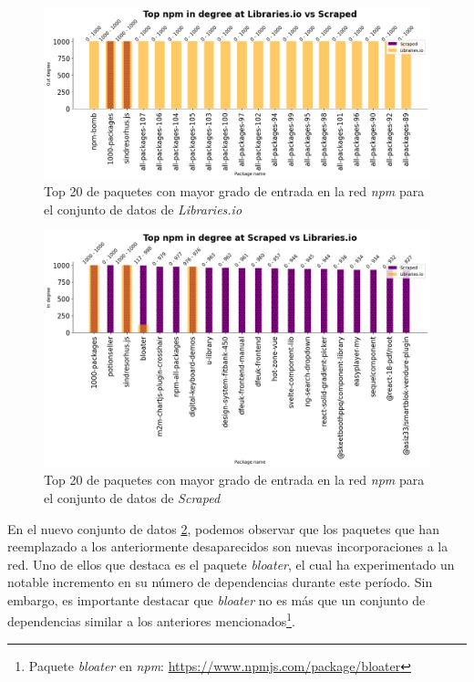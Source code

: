 \begin{figure}[ht!]
    \begin{center}
        \includegraphics[width=1\textwidth]{img/npm/ind_ls.png}
        \caption{Top 20 de paquetes con mayor grado de entrada en la red \textit{npm} para el conjunto de datos de \textit{Libraries.io}}
    \end{center}
    \label{fig:npm_ind_libraries}
\end{figure}

\begin{figure}[ht!]
    \begin{center}
        \includegraphics[width=1\textwidth]{img/npm/ind-sl.png}
        \caption{Top 20 de paquetes con mayor grado de entrada en la red \textit{npm} para el conjunto de datos de \textit{Scraped}}
    \end{center}
    \label{fig:npm_ind_scraped}
\end{figure}

En el nuevo conjunto de datos \ref{fig:npm_ind_scraped}, podemos observar que los paquetes que han reemplazado a los anteriormente desaparecidos
son nuevas incorporaciones a la red. Uno de ellos que destaca es el paquete \emph{bloater}, el cual ha experimentado
un notable incremento en su número de dependencias durante este período. Sin embargo, es importante destacar que \emph{bloater}
no es más que un conjunto de dependencias similar a los anteriores
mencionados\footnote{Paquete \emph{bloater} en \emph{npm}: \url{https://www.npmjs.com/package/bloater}}.